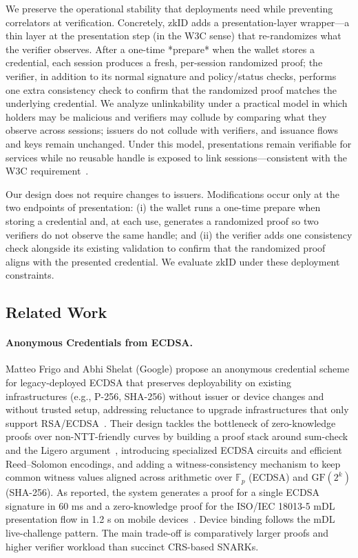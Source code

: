 We preserve the operational stability that deployments need while preventing correlators at verification.
Concretely, zkID adds a presentation-layer wrapper—a thin layer at the presentation step (in the W3C sense) that re-randomizes what the verifier observes. After a one-time *prepare* when the wallet stores a credential, each session produces a fresh, per-session randomized proof; the verifier, in addition to its normal signature and policy/status checks, performs one extra consistency check to confirm that the randomized proof matches the underlying credential.
We analyze unlinkability under a practical model in which holders may be malicious and verifiers may collude by comparing what they observe across sessions; issuers do not collude with verifiers, and issuance flows and keys remain unchanged.
Under this model, presentations remain verifiable for services while no reusable handle is exposed to link sessions—consistent with the W3C requirement~\cite{w3c-vc-data-model-2}.

Our design does not require changes to issuers. Modifications occur only at the two endpoints of presentation: (i) the wallet runs a one-time prepare when storing a credential and, at each use, generates a randomized proof so two verifiers do not observe the same handle; and (ii) the verifier adds one consistency check alongside its existing validation to confirm that the randomized proof aligns with the presented credential. We evaluate zkID under these deployment constraints.

\subsection{Related Work}

\paragraph{Anonymous Credentials from ECDSA.}
Matteo Frigo and Abhi Shelat (Google) propose an anonymous credential scheme for legacy-deployed ECDSA that preserves deployability on existing infrastructures (e.g., P-256, SHA-256) without issuer or device changes and without trusted setup, addressing reluctance to upgrade infrastructures that only support RSA/ECDSA~\cite{cryptoeprint:2024/2010}. Their design tackles the bottleneck of zero-knowledge proofs over non-NTT-friendly curves by building a proof stack around sum-check and the Ligero argument~\cite{CCS:AHIV17}, introducing specialized ECDSA circuits and efficient Reed–Solomon encodings, and adding a witness-consistency mechanism to keep common witness values aligned across arithmetic over $\mathbb{F}_{p}$ (ECDSA) and $\mathrm{GF}(2^k)$ (SHA-256). As reported, the system generates a proof for a single ECDSA signature in 60 ms and a zero-knowledge proof for the ISO/IEC 18013-5 mDL presentation flow in 1.2 s on mobile devices~\cite[\S5.3,\S6.2]{cryptoeprint:2024/2010}. Device binding follows the mDL live-challenge pattern. The main trade-off is comparatively larger proofs and higher verifier workload than succinct CRS-based SNARKs.

